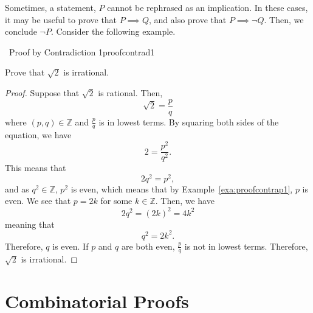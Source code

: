     Sometimes, a statement, \(P\) cannot be rephrased as an implication. In these cases, it may be useful to prove that \(P\implies Q\), and also prove that \(P\implies \neg Q\). Then, we conclude \(\neg P\). Consider the following example.
    \begin{example}{\Difficulty\,\Difficulty\,\,Proof by Contradiction 1}{proofcontrad1}
    
        Prove that \(\sqrt{2}\) is irrational.
        
        \begin{proof}
            Suppose that \(\sqrt{2}\) is rational. Then,
            \begin{equation*}
                \sqrt{2}=\frac{p}{q}
            \end{equation*}
            where \((p,q)\in\mathbb{Z}\) and \(\frac{p}{q}\) is in lowest terms. By squaring both sides of the equation, we have
            \begin{equation*}
                2=\frac{p^2}{q^2}.
            \end{equation*}
            This means that
            \begin{equation*}
                2q^2=p^2,
            \end{equation*}
            and as \(q^2\in\mathbb{Z}\), \(p^2\) is even, which means that by Example~\ref{exa:proofcontrap1}, \(p\) is even. We see that \(p=2k\) for some \(k\in\mathbb{Z}\). Then, we have
            \begin{equation*}
                2q^2=(2k)^2=4k^2
            \end{equation*}
            meaning that
            \begin{equation*}
                q^2=2k^2.
            \end{equation*}
            Therefore, \(q\) is even. If \(p\) and \(q\) are both even, \(\frac{p}{q}\) is not in lowest terms. Therefore, \(\sqrt{2}\) is irrational.
        \end{proof}
    
    \end{example}

\section{Combinatorial Proofs}
    
